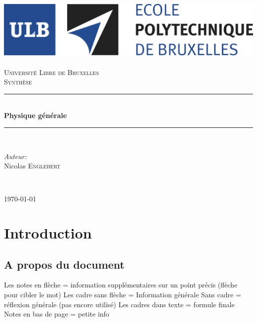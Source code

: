 \documentclass	[11pt, a4paper, openany]{book}
\begin{document}
\renewcommand{\proofname}{Démonstration}
\frontmatter
\begin{titlepage}
\begin{center}	
	
	\newcommand{\HRule}{\rule{\linewidth}{0.5mm}}   			%
	\includegraphics[scale=0.11]{logo.jpg}~\\[1cm]				%

	\textsc{\LARGE Université Libre de Bruxelles}\\[1.5cm]
	\textsc{\Large Synthèse}\\[0.5cm]

	\HRule \\[0.4cm]
	{ \huge \bfseries Physique générale \\[0.4cm] }


	\HRule \\[1.5cm]
		\begin{minipage}{0.4\textwidth}
		\begin{flushleft} \large
		
		\emph{Auteur:}\\
			Nicolas \textsc{Englebert}\\
			\end{flushleft}
			\end{minipage}
			\begin{minipage}{0.4\textwidth}
			\begin{flushright} \large
			\emph{} \\		
			\textsc{}
			\end{flushright}
		\end{minipage}

	\vfill

{\large \today}

\end{center}
\end{titlepage}





\part{Introduction}
\chapter{A propos du document}
Les notes en flèche = information supplémentaires sur un point précis (flèche pour cibler le mot)
Les cadre sans flèche = Information générale
Sans cadre = réflexion générale (pas encore utilisé)
Les cadres dans texte = formule finale
Notes en bas de page = petite info
\end{document}
